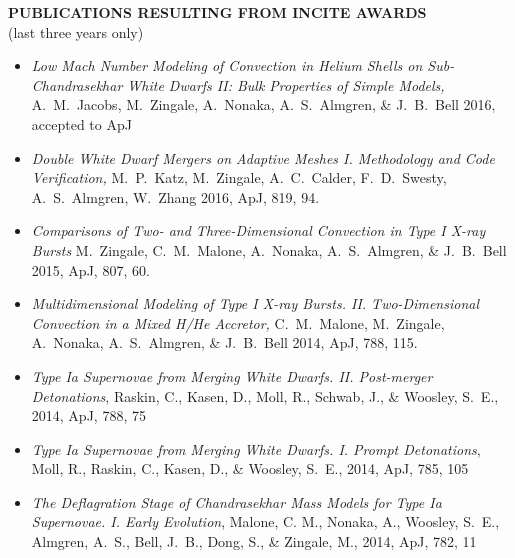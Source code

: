 \documentclass[11pt,letterpaper,english]{article}
\begin{document}
\setlength{\parindent}{0in} %


\pagestyle{fancy} 
 \renewcommand{%
\headrulewidth}{0.0pt}

\begin{center}
{\bf PUBLICATIONS RESULTING FROM INCITE AWARDS} \\
(last three years only)
\end{center}

\begin{itemize}

                                                                               
\item {\em Low Mach Number Modeling of Convection in Helium Shells on
  Sub-Chandrasekhar White Dwarfs II: Bulk Properties of Simple Models,
} A.~M.~Jacobs, M.~Zingale, A.~Nonaka, A.~S.~Almgren, \& J.~B.~Bell
  2016, accepted to ApJ

\item {\em Double White Dwarf Mergers on Adaptive Meshes
  I. Methodology and Code Verification, } M.~P.~Katz, M.~Zingale,
  A.~C.~Calder, F.~D.~Swesty, A.~S.~Almgren, W.~Zhang 2016, ApJ, 819,
  94.

\item {\em Comparisons of Two- and Three-Dimensional Convection in
  Type I X-ray Bursts} M.~Zingale, C.~M.~Malone, A.~Nonaka,
  A.~S.~Almgren, \& J.~B.~Bell 2015, ApJ, 807, 60.

\item {\em Multidimensional Modeling of Type I X-ray
  Bursts. II. Two-Dimensional Convection in a Mixed H/He Accretor, }
  C.~M.~Malone, M.~Zingale, A.~Nonaka, A.~S.~Almgren, \& J.~B.~Bell
  2014, ApJ, 788, 115.

\item {\em Type Ia Supernovae from Merging White
  Dwarfs. II. Post-merger Detonations}, Raskin, C., Kasen, D., Moll,
  R., Schwab, J., \& Woosley, S.~E., 2014, ApJ, 788, 75

\item {\em Type Ia Supernovae from Merging White Dwarfs. I. Prompt Detonations},
  Moll, R., Raskin, C., Kasen, D., \& Woosley, S.~E., 2014, ApJ, 785, 105

\item {\em The Deflagration Stage of Chandrasekhar Mass Models for
  Type Ia Supernovae. I. Early Evolution}, Malone, C. M., Nonaka, A.,
  Woosley, S.~E., Almgren, A.~S., Bell, J.~B., Dong, S., \& Zingale, M.,
  2014, ApJ, 782, 11


\end{itemize}
\end{document}
